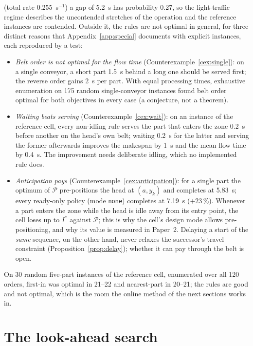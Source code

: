 \documentclass[11pt,a4paper]{article}
\theoremstyle{plain}
\theoremstyle{definition}
\theoremstyle{remark}
\newcommand{\Pb}{\mathcal{P}}
\begin{document}
(total rate 0.255~s$^{-1}$) a gap of 5.2~s has probability 0.27, so the light-traffic
regime describes the uncontended stretches of the operation and the reference instances
are contended. Outside it, the rules are not optimal in general, for three distinct reasons that
Appendix~\ref{app:special} documents with explicit instances, each reproduced by a test:
\begin{itemize}[nosep]
\item \emph{Belt order is not optimal for the flow time} (Counterexample~\ref{cex:single}):
  on a single conveyor, a short part 1.5~s behind a long one should be served first; the
  reverse order gains 2~s per part. With equal processing times, exhaustive enumeration
  on 175 random single-conveyor instances found belt order optimal for both objectives in
  every case (a conjecture, not a theorem).
\item \emph{Waiting beats serving} (Counterexample~\ref{cex:wait}): on an instance of the
  reference cell, every non-idling rule serves the part that enters the zone 0.2~s before
  another on the head's own belt; waiting 0.2~s for the latter and serving the former
  afterwards improves the makespan by 1~s and the mean flow time by 0.4~s. The
  improvement needs deliberate idling, which no implemented rule does.
\item \emph{Anticipation pays} (Counterexample~\ref{cex:anticipation}): for a single part
  the optimum of $\Pb$ pre-positions the head at $(a,y_k)$ and completes at 5.83~s; every
  ready-only policy (mode \texttt{none}) completes at 7.19~s ($+23$\,\%). Whenever a part enters the zone
  while the head is idle away from its entry point, the cell loses up to $I^\ast$ against
  $\Pb$; this is why the cell's design mode allows pre-positioning, and why its value is
  measured in Paper~2. Delaying a start of the \emph{same} sequence, on the other hand,
  never relaxes the successor's travel constraint (Proposition~\ref{prop:delay}); whether
  it can pay through the belt is open.
\end{itemize}
On 30 random five-part instances of the reference cell, enumerated over all 120 orders,
first-in was optimal in 21--22 and nearest-part in 20--21; the rules are good and not
optimal, which is the room the online method of the next sections works in.

\section{The look-ahead search}\label{sec:search}
\end{document}

